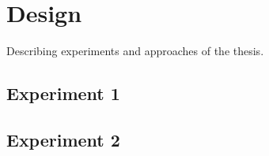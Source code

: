 \chapter{Design}
Describing experiments and approaches of the thesis.
\section{Experiment 1}

\section{Experiment 2}
